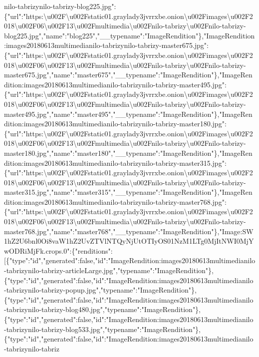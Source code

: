 nilo-tabrizynilo-tabrizy-blog225.jpg":\{"url":"https:\textbackslash{}u002F\textbackslash{}u002Fstatic01.graylady3jvrrxbe.onion\textbackslash{}u002Fimages\textbackslash{}u002F2018\textbackslash{}u002F06\textbackslash{}u002F13\textbackslash{}u002Fmultimedia\textbackslash{}u002Fnilo-tabrizy\textbackslash{}u002Fnilo-tabrizy-blog225.jpg","name":"blog225","\_\_typename":"ImageRendition"\},"ImageRendition:images20180613multimedianilo-tabrizynilo-tabrizy-master675.jpg":\{"url":"https:\textbackslash{}u002F\textbackslash{}u002Fstatic01.graylady3jvrrxbe.onion\textbackslash{}u002Fimages\textbackslash{}u002F2018\textbackslash{}u002F06\textbackslash{}u002F13\textbackslash{}u002Fmultimedia\textbackslash{}u002Fnilo-tabrizy\textbackslash{}u002Fnilo-tabrizy-master675.jpg","name":"master675","\_\_typename":"ImageRendition"\},"ImageRendition:images20180613multimedianilo-tabrizynilo-tabrizy-master495.jpg":\{"url":"https:\textbackslash{}u002F\textbackslash{}u002Fstatic01.graylady3jvrrxbe.onion\textbackslash{}u002Fimages\textbackslash{}u002F2018\textbackslash{}u002F06\textbackslash{}u002F13\textbackslash{}u002Fmultimedia\textbackslash{}u002Fnilo-tabrizy\textbackslash{}u002Fnilo-tabrizy-master495.jpg","name":"master495","\_\_typename":"ImageRendition"\},"ImageRendition:images20180613multimedianilo-tabrizynilo-tabrizy-master180.jpg":\{"url":"https:\textbackslash{}u002F\textbackslash{}u002Fstatic01.graylady3jvrrxbe.onion\textbackslash{}u002Fimages\textbackslash{}u002F2018\textbackslash{}u002F06\textbackslash{}u002F13\textbackslash{}u002Fmultimedia\textbackslash{}u002Fnilo-tabrizy\textbackslash{}u002Fnilo-tabrizy-master180.jpg","name":"master180","\_\_typename":"ImageRendition"\},"ImageRendition:images20180613multimedianilo-tabrizynilo-tabrizy-master315.jpg":\{"url":"https:\textbackslash{}u002F\textbackslash{}u002Fstatic01.graylady3jvrrxbe.onion\textbackslash{}u002Fimages\textbackslash{}u002F2018\textbackslash{}u002F06\textbackslash{}u002F13\textbackslash{}u002Fmultimedia\textbackslash{}u002Fnilo-tabrizy\textbackslash{}u002Fnilo-tabrizy-master315.jpg","name":"master315","\_\_typename":"ImageRendition"\},"ImageRendition:images20180613multimedianilo-tabrizynilo-tabrizy-master768.jpg":\{"url":"https:\textbackslash{}u002F\textbackslash{}u002Fstatic01.graylady3jvrrxbe.onion\textbackslash{}u002Fimages\textbackslash{}u002F2018\textbackslash{}u002F06\textbackslash{}u002F13\textbackslash{}u002Fmultimedia\textbackslash{}u002Fnilo-tabrizy\textbackslash{}u002Fnilo-tabrizy-master768.jpg","name":"master768","\_\_typename":"ImageRendition"\},"Image:SW1hZ2U6bnl0Oi8vaW1hZ2UvZTVlNTQyNjUtOTIyOS01NzM1LTg0MjItNWI0MjYwODRiMjFk.crops.0":\{"renditions":{[}\{"type":"id","generated":false,"id":"ImageRendition:images20180613multimedianilo-tabrizynilo-tabrizy-articleLarge.jpg","typename":"ImageRendition"\},\{"type":"id","generated":false,"id":"ImageRendition:images20180613multimedianilo-tabrizynilo-tabrizy-popup.jpg","typename":"ImageRendition"\},\{"type":"id","generated":false,"id":"ImageRendition:images20180613multimedianilo-tabrizynilo-tabrizy-blog480.jpg","typename":"ImageRendition"\},\{"type":"id","generated":false,"id":"ImageRendition:images20180613multimedianilo-tabrizynilo-tabrizy-blog533.jpg","typename":"ImageRendition"\},\{"type":"id","generated":false,"id":"ImageRendition:images20180613multimedianilo-tabrizynilo-tabriz